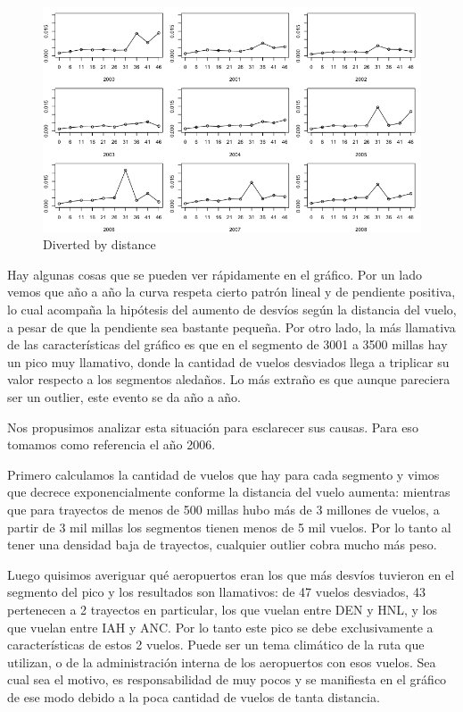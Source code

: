 \begin{figure}[h!]
  \begin{center}
	\includegraphics[scale=0.4]{img/diverted_by_distance.png}
	\caption{Diverted by distance}
  \end{center}
\end{figure}

Hay algunas cosas que se pueden ver r\'apidamente en el gr\'afico. 
Por un lado vemos que a\~no a a\~no la curva respeta cierto patr\'on lineal y de pendiente positiva, lo cual acompa\~na la hip\'otesis del aumento de desv\'ios seg\'un la distancia del vuelo, a pesar de que la pendiente sea bastante peque\~na.
Por otro lado, la m\'as llamativa de las caracter\'isticas del gr\'afico es que en el segmento de 3001 a 3500 millas hay un pico muy llamativo, donde la cantidad de vuelos desviados llega a triplicar su valor respecto a los segmentos aleda\~nos. Lo m\'as extra\~no es que aunque pareciera ser un outlier, este evento se da a\~no a a\~no.

Nos propusimos analizar esta situaci\'on para esclarecer sus causas. Para eso tomamos como referencia el a\~no 2006. 

Primero calculamos la cantidad de vuelos que hay para cada segmento y vimos que decrece exponencialmente conforme la distancia del vuelo aumenta: mientras que para trayectos de menos de 500 millas hubo m\'as de 3 millones de vuelos, a partir de 3 mil millas los segmentos tienen menos de 5 mil vuelos. Por lo tanto al tener una densidad baja de trayectos, cualquier outlier cobra mucho m\'as peso. 

Luego quisimos averiguar qu\'e aeropuertos eran los que m\'as desv\'ios tuvieron en el segmento del pico y los resultados son llamativos: de 47 vuelos desviados, 43 pertenecen a 2 trayectos en particular, los que vuelan entre DEN y HNL, y los que vuelan entre IAH y ANC.
Por lo tanto este pico se debe exclusivamente a caracter\'isticas de estos 2 vuelos. Puede ser un tema clim\'atico de la ruta que utilizan, o de la administraci\'on interna de los aeropuertos con esos vuelos. Sea cual sea el motivo, es responsabilidad de muy pocos y se manifiesta en el gr\'afico de ese modo debido a la poca cantidad de vuelos de tanta distancia.


